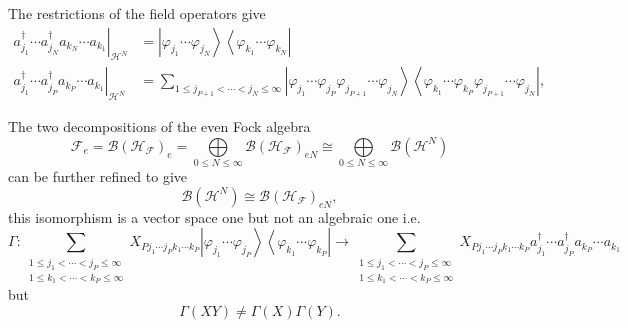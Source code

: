 \documentclass[aps,preprint]{revtex4}%
\begin{document}
The restrictions of the field operators give
\begin{align}
\left.  a_{j_{1}}^{\dagger}\cdots a_{j_{N}}^{\dagger}a_{k_{N}}\cdots a_{k_{1}%
}\right\vert _{\mathcal{H}^{N}}  &  =\left\vert \varphi_{j_{1}}\cdots
\varphi_{j_{N}}\right\rangle \left\langle \varphi_{k_{1}}\cdots\varphi_{k_{N}%
}\right\vert \nonumber\\
\left.  a_{j_{1}}^{\dagger}\cdots a_{j_{P}}^{\dagger}a_{k_{P}}\cdots a_{k_{1}%
}\right\vert _{\mathcal{H}^{N}}  &  =\sum_{1\leq j_{P+1}<\cdots<j_{N}%
\leq\infty}\left\vert \varphi_{j_{1}}\cdots\varphi_{j_{P}}\varphi_{j_{P+1}%
}\cdots\varphi_{j_{N}}\right\rangle \left\langle \varphi_{k_{1}}\cdots
\varphi_{k_{P}}\varphi_{j_{P+1}}\cdots\varphi_{j_{N}}\right\vert ,
\end{align}


The two decompositions of the even Fock algebra%
\begin{equation}
\mathcal{F}_{e}=\mathcal{B}\left(  \mathcal{H}_{\mathcal{F}}\right)  _{e}=%
{\displaystyle\bigoplus\limits_{0\leq N\leq\infty}}
\mathcal{B}\left(  \mathcal{H}_{\mathcal{F}}\right)  _{eN}\cong%
{\displaystyle\bigoplus\limits_{0\leq N\leq\infty}}
\mathcal{B}\left(  \mathcal{H}^{N}\right)
\end{equation}
can be further refined to give
\begin{equation}
\mathcal{B}\left(  \mathcal{H}^{N}\right)  \cong\mathcal{B}\left(
\mathcal{H}_{\mathcal{F}}\right)  _{eN},
\end{equation}
this isomorphism is a vector space one but not an algebraic one i.e.%
\begin{equation}
\Gamma:\sum_{\substack{1\leq j_{1}<\cdots<j_{P}\leq\infty\\1\leq k_{1}%
<\cdots<k_{P}\leq\infty}}X_{Pj_{1}\cdots j_{P}k_{1}\cdots k_{P}}\left\vert
\varphi_{j_{1}}\cdots\varphi_{j_{P}}\right\rangle \left\langle \varphi_{k_{1}%
}\cdots\varphi_{k_{P}}\right\vert \longrightarrow\sum_{\substack{1\leq
j_{1}<\cdots<j_{P}\leq\infty\\1\leq k_{1}<\cdots<k_{P}\leq\infty}%
}X_{Pj_{1}\cdots j_{P}k_{1}\cdots k_{P}}a_{j_{1}}^{\dagger}\cdots a_{j_{P}%
}^{\dagger}a_{k_{P}}\cdots a_{k_{1}}%
\end{equation}
but
\begin{equation}
\Gamma(XY)\neq\Gamma(X)\Gamma(Y).
\end{equation}
\end{document}
